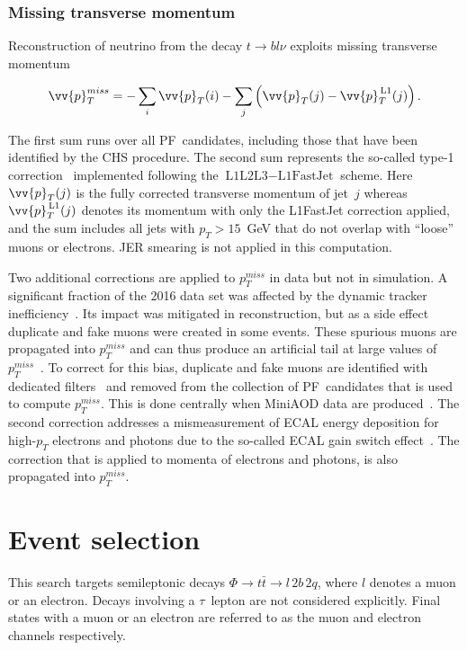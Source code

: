 \subsubsection*{Missing transverse momentum}\label{subsec:met}
%
Reconstruction of neutrino from the decay $t \rightarrow bl\nu$ exploits missing transverse momentum
\begin{linenomath}
\begin{equation}
\vv{p}_{T}^{miss} = -\sum_i \vv{p}_{T}(i) - \sum_j \left(\vv{p}_{T}(j) - \vv{p}_{T}^\text{\,L1}(j)\right).
\end{equation}
\end{linenomath}
The first sum runs over all PF~candidates, including those that have been identified by the CHS procedure.
The second sum represents the so-called type-1 correction~\cite{CMS-PAS-JME-16-004} implemented following the $\text{L1L2L3} - \text{L1FastJet}$ scheme.
Here $\vv{p}_{T}(j)$ is the fully corrected transverse momentum of jet~$j$ whereas $\vv{p}_{T}^\text{\,L1}(j)$ denotes its momentum with only the L1FastJet correction applied, and the sum includes all jets with $p_{T} > 15$~GeV that do not overlap with ``loose'' muons or electrons.
JER smearing is not applied in this computation.

Two additional corrections are applied to $p_{T}^{miss}$ in data but not in simulation.
A significant fraction of the 2016 data set was affected by the dynamic tracker inefficiency~\cite{Talk:DTI}.
Its impact was mitigated in reconstruction, but as a side effect duplicate and fake muons were created in some events.
These spurious muons are propagated into $p_{T}^{miss}$ and can thus produce an artificial tail at large values of $p_{T}^{miss}$~\cite{Talk:SpuriousMuons}.
To correct for this bias, duplicate and fake muons are identified with dedicated filters~\cite{HN:GiovanniFilters} and removed from the collection of PF~candidates that is used to compute $p_{T}^{miss}$.
This is done centrally when MiniAOD data are produced~\cite{Talk:FebReMiniAOD}.
The second correction addresses a mismeasurement of ECAL energy deposition for high-$p_{T}$ electrons and photons due to the so-called ECAL gain switch effect~\cite{Talk:ECALGainSwitch}.
The correction that is applied to momenta of electrons and photons, is also propagated into $p_{T}^{miss}$.

\section{Event selection}
\label{Sec:EventSelection}
%
This search targets semileptonic decays $\Phi \rightarrow t\bar t \rightarrow l\,2b\,2q$, where $l$ denotes a muon or an electron.
Decays involving a $\tau$~lepton are not considered explicitly.
Final states with a muon or an electron are referred to as the muon and electron channels respectively.

